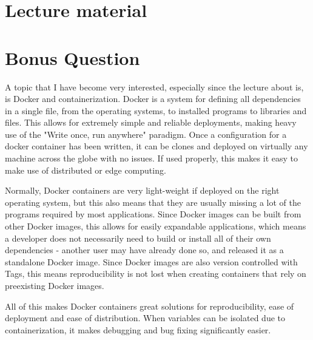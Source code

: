 \documentclass{article}
\begin{document}
\section{Lecture material}


\section{Bonus Question}

A topic that I have become very interested, especially since the lecture about is, is Docker and containerization. Docker is a system for defining all dependencies in a single file, from the operating systems, to installed programs to libraries and files. This allows for extremely simple and reliable deployments, making heavy use of the "Write once, run anywhere" paradigm. Once a configuration for a docker container has been written, it can be clones and deployed on virtually any machine across the globe with no issues. If used properly, this makes it easy to make use of distributed or edge computing.

Normally, Docker containers are very light-weight if deployed on the right operating system, but this also means that they are usually missing a lot of the programs required by most applications. Since Docker images can be built from other Docker images, this allows for easily expandable applications, which means a developer does not necessarily need to build or install all of their own dependencies - another user may have already done so, and released it as a standalone Docker image. Since Docker images are also version controlled with Tags, this means reproducibility is not lost when creating containers that rely on preexisting Docker images.

All of this makes Docker containers great solutions for reproducibility, ease of deployment and ease of distribution. When variables can be isolated due to containerization, it makes debugging and bug fixing significantly easier.

\printbibliography
\end{document}
